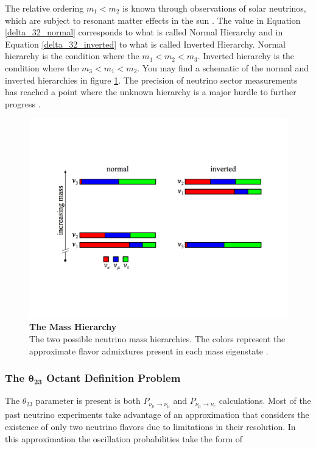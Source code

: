 The relative ordering $m_1 < m_2$ is known through observations of solar neutrinos, which are subject to resonant matter effects in the sun \cite{delta_2_1}. The value in Equation \ref{delta_32_normal} corresponds to what is called Normal Hierarchy and in Equation \ref{delta_32_inverted} to what is called Inverted Hierarchy. Normal hierarchy is the condition where the $m_1 < m_2 < m_3$. Inverted hierarchy is the condition where the $m_3 < m_1 < m_2$. You may find a schematic of the normal and inverted hierarchies in figure \ref{mass_hierarchy}. The precision of neutrino sector measurements has reached a point where the unknown hierarchy is a major hurdle to further progress \cite{prospects_patterson}.

\begin{figure}
	\begin{center}
		\includegraphics[scale=0.5]{Figures/mass_hierarchy.pdf}
		\caption[The Mass Hierarchy]{ {\textbf{The Mass Hierarchy}}\\The two possible neutrino mass hierarchies. The colors represent the approximate flavor admixtures present in each mass eigenstate \cite{prospects_patterson}.}
		\label{mass_hierarchy}	
	\end{center}
\end{figure}

\subsubsection{The $\mathbf{\theta_{23}}$ Octant Definition Problem}

The $\theta_{23}$ parameter is present is both $P_{\nu_\mu \rightarrow \nu_\mu}$ and $P_{\nu_\mu \rightarrow \nu_e}$ calculations. Most of the past neutrino experiments take advantage of an approximation that considers the existence of only two neutrino flavors due to limitations in their resolution. In this approximation the oscillation probabilities take the form of

